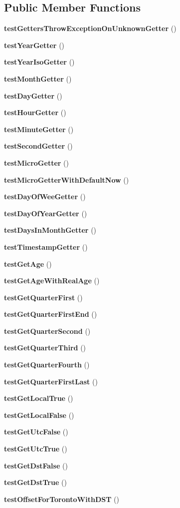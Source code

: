 \subsection*{Public Member Functions}
\begin{DoxyCompactItemize}
\item 
{\bf test\+Getters\+Throw\+Exception\+On\+Unknown\+Getter} ()
\item 
{\bf test\+Year\+Getter} ()
\item 
{\bf test\+Year\+Iso\+Getter} ()
\item 
{\bf test\+Month\+Getter} ()
\item 
{\bf test\+Day\+Getter} ()
\item 
{\bf test\+Hour\+Getter} ()
\item 
{\bf test\+Minute\+Getter} ()
\item 
{\bf test\+Second\+Getter} ()
\item 
{\bf test\+Micro\+Getter} ()
\item 
{\bf test\+Micro\+Getter\+With\+Default\+Now} ()
\item 
{\bf test\+Day\+Of\+Wee\+Getter} ()
\item 
{\bf test\+Day\+Of\+Year\+Getter} ()
\item 
{\bf test\+Days\+In\+Month\+Getter} ()
\item 
{\bf test\+Timestamp\+Getter} ()
\item 
{\bf test\+Get\+Age} ()
\item 
{\bf test\+Get\+Age\+With\+Real\+Age} ()
\item 
{\bf test\+Get\+Quarter\+First} ()
\item 
{\bf test\+Get\+Quarter\+First\+End} ()
\item 
{\bf test\+Get\+Quarter\+Second} ()
\item 
{\bf test\+Get\+Quarter\+Third} ()
\item 
{\bf test\+Get\+Quarter\+Fourth} ()
\item 
{\bf test\+Get\+Quarter\+First\+Last} ()
\item 
{\bf test\+Get\+Local\+True} ()
\item 
{\bf test\+Get\+Local\+False} ()
\item 
{\bf test\+Get\+Utc\+False} ()
\item 
{\bf test\+Get\+Utc\+True} ()
\item 
{\bf test\+Get\+Dst\+False} ()
\item 
{\bf test\+Get\+Dst\+True} ()
\item 
{\bf test\+Offset\+For\+Toronto\+With\+D\+S\+T} ()

\end{DoxyCompactItemize}
